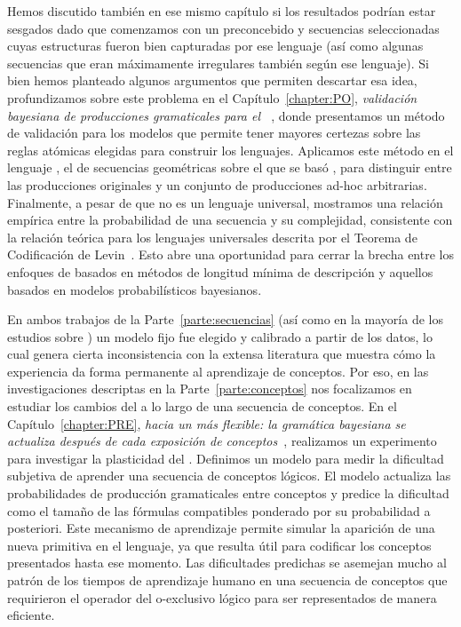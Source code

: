 Hemos discutido también en ese mismo capítulo si los resultados podrían estar sesgados dado que comenzamos con un \lot preconcebido y secuencias seleccionadas cuyas estructuras fueron bien capturadas por ese lenguaje (así como algunas secuencias que eran máximamente irregulares también según ese lenguaje). Si bien hemos planteado algunos argumentos que permiten descartar esa idea, profundizamos sobre este problema en el Capítulo~\ref{chapter:PO}, \textit{validación bayesiana de producciones gramaticales para el \lot~\cite{romano2018bayesian}}, donde presentamos un método de validación para los modelos \lot que permite tener mayores certezas sobre las reglas atómicas elegidas para construir los lenguajes. Aplicamos este método en el lenguaje \gramgeo, el \lot de secuencias geométricas sobre el que se basó \grambin, para distinguir entre las producciones originales y un conjunto de producciones ad-hoc arbitrarias. Finalmente, a pesar de que \gramgeo no es un lenguaje universal, mostramos una relación empírica entre la probabilidad de una secuencia y su complejidad, consistente con la relación teórica para los lenguajes universales descrita por el Teorema de Codificación de Levin~\cite{levin1974laws}. Esto abre una oportunidad para cerrar la brecha entre los enfoques de \lot basados en métodos de longitud mínima de descripción y aquellos basados en modelos probabilísticos bayesianos.

En ambos trabajos de la Parte~\ref{parte:secuencias} (así como en la mayoría de los estudios sobre \lot) un modelo fijo fue elegido y calibrado a partir de los datos, lo cual genera cierta inconsistencia con la extensa literatura que muestra cómo la experiencia da forma permanente al aprendizaje de conceptos. Por eso, en las investigaciones descriptas en la Parte~\ref{parte:conceptos} nos focalizamos en estudiar los cambios del \lot a lo largo de una secuencia de conceptos. En el Capítulo~\ref{chapter:PRE}, \textit{hacia un \lot más flexible: la gramática bayesiana se actualiza después de cada exposición de conceptos~\cite{tano2020towards}}, realizamos un experimento para investigar la plasticidad del \lot. Definimos un modelo para medir la dificultad subjetiva de aprender una secuencia de conceptos lógicos. El modelo actualiza las probabilidades de producción gramaticales entre conceptos y predice la dificultad como el tamaño de las fórmulas compatibles ponderado por su probabilidad a posteriori. Este mecanismo de aprendizaje permite simular la aparición de una nueva primitiva en el lenguaje, ya que resulta útil para codificar los conceptos presentados hasta ese momento. Las dificultades predichas se asemejan mucho al patrón de los tiempos de aprendizaje humano en una secuencia de conceptos que requirieron el operador del o-exclusivo lógico para ser representados de manera eficiente.

